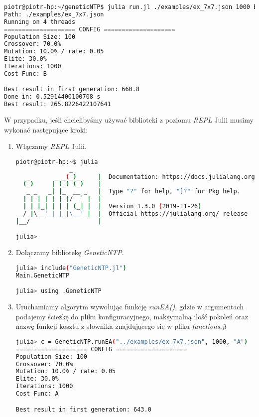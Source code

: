 \begin{lstlisting}[language=bash, frame=single]
piotr@piotr-hp:~/geneticNTP$ julia run.jl ./examples/ex_7x7.json 1000 B
Path: ./examples/ex_7x7.json
Running on 4 threads
==================== CONFIG ====================
Population Size: 100
Crossover: 70.0%
Mutation: 10.0% / rate: 0.05
Elite: 30.0%
Iterations: 1000
Cost Func: B

Best result in first generation: 660.8
Done in: 0.52914400100708 s
Best result: 265.8226422107641
\end{lstlisting}

W przypadku, jeśli chcielibyśmy używać biblioteki z poziomu \textit{REPL} Julii musimy wykonać następujące kroki:

\begin{enumerate}
    \item Włączamy \textit{REPL} Julii.
\begin{lstlisting}[language=bash, frame=single]
piotr@piotr-hp:~$ julia 
               _
   _       _ _(_)_     |  Documentation: https://docs.julialang.org
  (_)     | (_) (_)    |
   _ _   _| |_  __ _   |  Type "?" for help, "]?" for Pkg help.
  | | | | | | |/ _` |  |
  | | |_| | | | (_| |  |  Version 1.3.0 (2019-11-26)
 _/ |\__'_|_|_|\__'_|  |  Official https://julialang.org/ release
|__/                   |

julia> 

\end{lstlisting}

    \item Dołączamy bibliotekę \textit{GeneticNTP}.
\begin{lstlisting}[language=bash, frame=single]
julia> include("GeneticNTP.jl")
Main.GeneticNTP

julia> using .GeneticNTP
\end{lstlisting}

    \item Uruchamiamy algorytm wywołując funkcję \textit{runEA()}, gdzie w argumentach podajemy ścieżkę do pliku konfiguracyjnego, 
        maksymalną ilość pokoleń oraz nazwę funkcji kosztu z słownika znajdującego się w pliku \textit{functions.jl}
\begin{lstlisting}[language=bash, frame=single]
julia> c = GeneticNTP.runEA("../examples/ex_7x7.json", 1000, "A")
==================== CONFIG ====================
Population Size: 100
Crossover: 70.0%
Mutation: 10.0% / rate: 0.05
Elite: 30.0%
Iterations: 1000
Cost Func: A

Best result in first generation: 643.0    
\end{lstlisting}


\end{enumerate}
